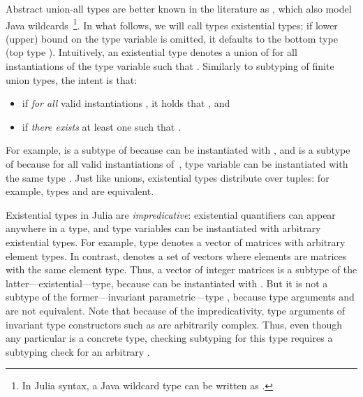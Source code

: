Abstract union-all types  are better known
in the literature as , which also model
Java wildcards~\cite{bib:torgersen:wildcards:2004}\footnote{In Julia syntax, 
a Java wildcard type
 can be written as .}.
In what follows, we will call types  existential types;
if lower (upper) bound on the type variable is omitted, it defaults to the
bottom type  (top type ).
Intuitively, an existential type denotes a union of  for all
instantiations of the type variable  such that .
Similarly to subtyping of finite union types, the intent is that:
\begin{itemize}
  \item {} if \emph{for all} valid instantiations
    , it holds that , and
  \item {} if \emph{there exists} at least one 
     such that .
\end{itemize}
For example,  is a subtype of  because  can be instantiated with ,
and  is a subtype of
 because for all valid instantiations  of~,
type variable  can be instantiated with the same type .
Just like unions, existential types distribute over tuples:
for example, types 
and  are equivalent.

Existential types in Julia are \emph{impredicative}:
existential quantifiers can appear anywhere in a type,
and type variables can be instantiated with arbitrary existential types.
For example, type  denotes a vector
of matrices with arbitrary element types.
In contrast,  denotes a set of vectors where
elements are matrices with the same element type.
Thus, a vector of integer matrices  is a subtype
of the latter---existential---type, because  can be instantiated with
. But it is not a subtype of the former---invariant parametric---type
, because type arguments 
and  are not equivalent.
Note that because of the impredicativity, type arguments of invariant type
constructors such as  are arbitrarily complex. Thus, even though any
particular  is a concrete type, checking subtyping for this
type requires a subtyping check for an arbitrary .

